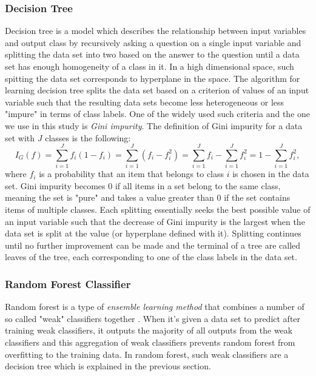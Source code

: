 \documentclass[..]{revtex4}
\begin{document}
		\subsubsection{Decision Tree}
		Decision tree is a model which describes the relationship between input variables and output class by recursively asking a question on a single input variable and splitting the data set into two based on the answer to the question until a data set has enough homogeneity of a class in it. In a high dimensional space, such spitting the data set corresponds to hyperplane in the space. The algorithm for learning decision tree splits the data set based on a criterion of values of an input variable such that the resulting data sets become less heterogeneous or less "impure" in terms of class labels. One of the widely used such criteria and the one we use in this study is \textit{Gini impurity}. The definition of Gini impurity for a data set with $J$ classes is the following:
	\begin{equation}
	I_G(f) = \sum_{i=1}^J f_i(1-f_i) = \sum_{i=1}^J (f_i-f_i^2) =  \sum_{i=1}^J f_i - \sum_{i=1}^J f_i^2 = 1- \sum_{i=1}^J f_i^2,
	\end{equation}
where $f_i$ is a probability that an item that belongs to class $i$ is chosen in the data set. Gini impurity becomes $0$ if all items in a set belong to the same class, meaning the set is "pure" and takes a value greater than $0$ if the set contains items of multiple classes. Each splitting essentially seeks the best possible value of an input variable such that the decrease of Gini impurity is the largest when the data set is split at the value (or hyperplane defined with it). Splitting continues until no further improvement can be made and the terminal of a tree are called leaves of the tree, each corresponding to one of the class labels in the data set.
		
	
		\subsubsection{Random Forest Classifier}
Random forest is a type of \textit{ensemble learning method} that combines a number of so called "weak" classifiers together \cite{RandomForest}. When it's given a data set to predict after training weak classifiers, it outputs the majority of all outputs from the weak classifiers and this aggregation of weak classifiers prevents random forest from overfitting to the training data. In random forest, such weak classifiers are a decision tree which is explained in the previous section.
\end{document}
